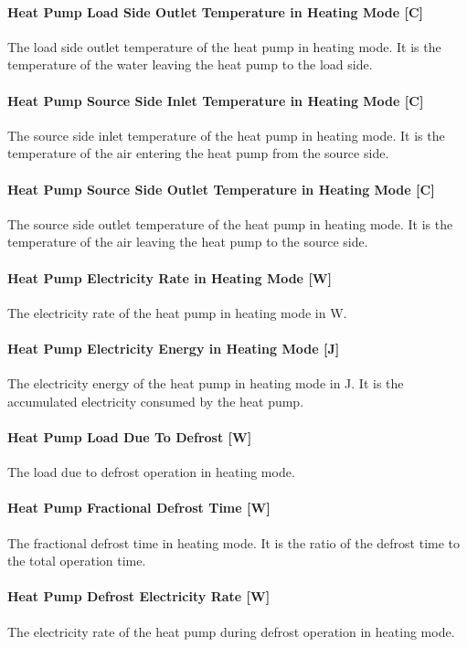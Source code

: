 \paragraph{Heat Pump Load Side Outlet Temperature in Heating Mode {[}C{]}} The
load side outlet temperature of the heat pump in heating mode. It is the
temperature of the water leaving the heat pump to the load side.
\paragraph{Heat Pump Source Side Inlet Temperature in Heating Mode {[}C{]}} The
source side inlet temperature of the heat pump in heating mode. It is the
temperature of the air entering the heat pump from the source side.
\paragraph{Heat Pump Source Side Outlet Temperature in Heating Mode {[}C{]}} The
source side outlet temperature of the heat pump in heating mode. It is the
temperature of the air leaving the heat pump to the source side.
\paragraph{Heat Pump Electricity Rate in Heating Mode {[}W{]}} The electricity
rate of the heat pump in heating mode in W.
\paragraph{Heat Pump Electricity Energy in Heating Mode {[}J{]}} The electricity
energy of the heat pump in heating mode in J. It is the accumulated electricity
consumed by the heat pump.
\paragraph{Heat Pump Load Due To Defrost {[}W{]}} The load due to defrost
operation in heating mode.
\paragraph{Heat Pump Fractional Defrost Time {[}W{]}} The fractional defrost
time in heating mode. It is the ratio of the defrost time to the total operation
time.
\paragraph{Heat Pump Defrost Electricity Rate {[}W{]}} The electricity rate of
the heat pump during defrost operation in heating mode.

